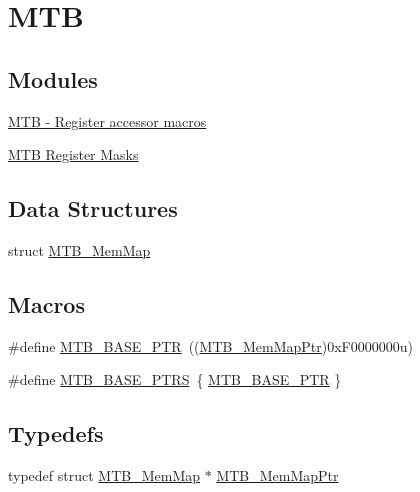 \hypertarget{group___m_t_b___peripheral}{}\section{M\+T\+B}
\label{group___m_t_b___peripheral}
\subsection*{Modules}
\begin{DoxyCompactItemize}
\item 
\hyperlink{group___m_t_b___register___accessor___macros}{M\+T\+B -\/ Register accessor macros}
\item 
\hyperlink{group___m_t_b___register___masks}{M\+T\+B Register Masks}
\end{DoxyCompactItemize}
\subsection*{Data Structures}
\begin{DoxyCompactItemize}
\item 
struct \hyperlink{struct_m_t_b___mem_map}{M\+T\+B\+\_\+\+Mem\+Map}
\end{DoxyCompactItemize}
\subsection*{Macros}
\begin{DoxyCompactItemize}
\item 
\#define \hyperlink{group___m_t_b___peripheral_gadf7f362dfa67354951e6a23ddf08cd73}{M\+T\+B\+\_\+\+B\+A\+S\+E\+\_\+\+P\+T\+R}~((\hyperlink{group___m_t_b___peripheral_ga2d3d13148d5c08e92b1ad2eeb14342da}{M\+T\+B\+\_\+\+Mem\+Map\+Ptr})0x\+F0000000u)
\item 
\#define \hyperlink{group___m_t_b___peripheral_ga45b3138a9794fd8f2c7613b48646e44f}{M\+T\+B\+\_\+\+B\+A\+S\+E\+\_\+\+P\+T\+R\+S}~\{ \hyperlink{group___m_t_b___peripheral_gadf7f362dfa67354951e6a23ddf08cd73}{M\+T\+B\+\_\+\+B\+A\+S\+E\+\_\+\+P\+T\+R} \}
\end{DoxyCompactItemize}
\subsection*{Typedefs}
\begin{DoxyCompactItemize}
\item 
typedef struct \hyperlink{struct_m_t_b___mem_map}{M\+T\+B\+\_\+\+Mem\+Map} $\ast$ \hyperlink{group___m_t_b___peripheral_ga2d3d13148d5c08e92b1ad2eeb14342da}{M\+T\+B\+\_\+\+Mem\+Map\+Ptr}
\end{DoxyCompactItemize}


